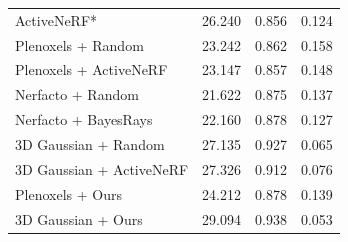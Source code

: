 \begin{table}[t]
\begin{minipage}{0.47 \textwidth}
{\begin{tabular}{l|ccc}
ActiveNeRF*              &                      26.240 &                      0.856 &                      0.124  \\
Plenoxels + Random        &                      23.242 &                      0.862 &                      0.158  \\
Plenoxels + ActiveNeRF    &                      23.147 &                      0.857 &                      0.148  \\
Nerfacto + Random        &                      21.622 &                      0.875 &                      0.137  \\
Nerfacto + BayesRays     &                      22.160 &                      0.878 &                      0.127  \\
3D Gaussian + Random     &  \cellcolor{tabthird}27.135 & \cellcolor{tabsecond}0.927 & \cellcolor{tabsecond}0.065  \\
3D Gaussian + ActiveNeRF & \cellcolor{tabsecond}27.326 &  \cellcolor{tabthird}0.912 &  \cellcolor{tabthird}0.076  \\
\hline
Plenoxels + Ours          &                      24.212 &                      0.878 &                      0.139  \\
3D Gaussian + Ours       &  \cellcolor{tabfirst}29.094 &  \cellcolor{tabfirst}0.938 &  \cellcolor{tabfirst}0.053 

    \end{tabular}
    }
\end{minipage}
\end{table}
